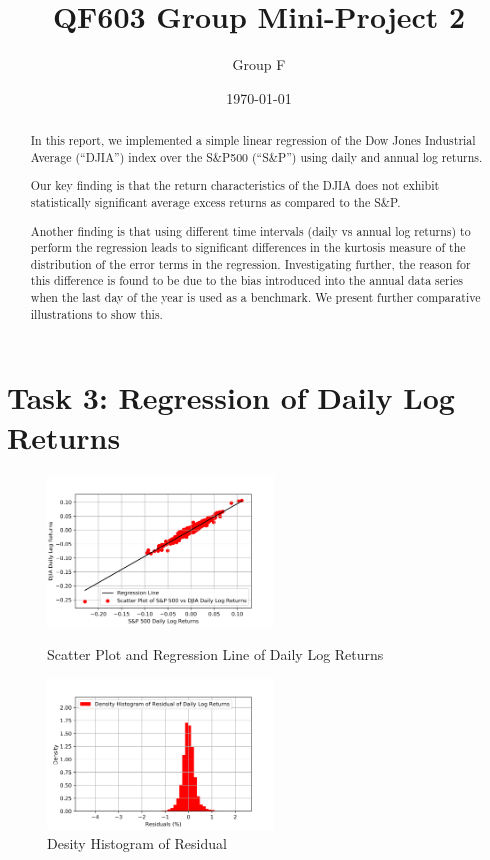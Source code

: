 \documentclass[a4paper]{article}
\title{QF603 Group Mini-Project 2}
\author{Group F}
\date{\today}
\begin{document}
	\maketitle
	
	\begin{abstract}
		In this report, we implemented a simple linear regression of the Dow Jones Industrial Average (“DJIA”) index over the S\&P500 (“S\&P”) using daily and annual log returns.
		
	\vspace{6pt}
	
		Our key finding is that the return characteristics of the DJIA does not exhibit statistically significant average excess returns as compared to the S\&P.
		
	\vspace{6pt} 
	
		Another finding is that using different time intervals (daily vs annual log returns) to perform the regression leads to significant differences in the kurtosis measure of the distribution of the error terms in the regression. Investigating further, the reason for this difference is found to be due to the bias introduced into the annual data series when the last day of the year is used as a benchmark. We present further comparative illustrations to show this. 
		
		 	
	\end{abstract} 
	
	\newpage
	\setcounter{secnumdepth}{1}
	\section*{Task 3: Regression of Daily Log Returns}
	\label{sec:introduction}
	
	\begin{figure}[htbp]
		\centering
		\begin{minipage}[t]{0.48\textwidth}
			\centering
			\includegraphics[width=6cm]{Daily_Scatter.png}
			\captionsetup{font=small}
			\caption{Scatter Plot and Regression Line of Daily Log Returns}
		\end{minipage}
		\begin{minipage}[t]{0.48\textwidth}
			\centering
			\includegraphics[width=6cm]{Daily_Hist.png}
			\captionsetup{font=small}
			\caption{Desity Histogram of Residual}
		\end{minipage}
	\end{figure}
	
\end{document}

